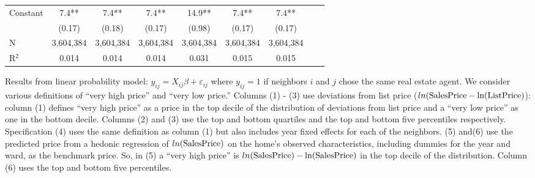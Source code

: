 \documentclass[12pt]{article}
\newcommand{\se}[1]{\footnotesize{(#1)}}
\begin{document}
\begin{sidewaystable}[ht]
\begin{tabular}{@{}lcccccccc@{}}
\multirow{2}{*}{Constant}                & 7.4**     & 7.4**     & 7.4**     & 14.9**    & 7.4**     & 7.4**\\
                                         & \se{0.17} & \se{0.18} & \se{0.17} & \se{0.98} & \se{0.17} & \se{0.17}\\\midrule
N                                        & 3,604,384 & 3,604,384 & 3,604,384 & 3,604,384 & 3,604,384 & 3,604,384\\
R$^2$                                    & 0.014     &  0.014    & 0.014     &  0.031    &  0.015    & 0.015 \\\bottomrule
\end{tabular}
\begin{minipage}{.88\hsize}{\footnotesize
    Results from linear probability model:  $y_{ij} = X_{ij} \beta + \varepsilon_{ij}$  where $y_{ij} = 1$ if neighbors $i$ and $j$ chose the same real estate agent.   We consider various definitions of ``very high price'' and ``very low price.'' Columns (1) - (3) use deviations from list price  ($ln(\rm{Sales Price} - ln(\rm{List Price})$): column (1) defines ``very high price'' as a price in the top decile of the distribution of   deviations from list price and a ``very low price'' as one in the bottom decile. Columns (2) and (3) use the top and bottom quartiles and the top   and bottom five percentiles respectively. Specification (4) uses the same definition as column (1) but also includes year fixed effects for each   of the neighbors.    (5) and(6) use the predicted price from a hedonic regression of $ln(\rm{Sales Price})$ on the home's observed characteristics, including dummies  for the year and ward, as the benchmark price. So, in (5) a ``very high price'' is $ln(\rm{Sales Price}) - ln(\rm{Sales Price})$ in the top decile of the distribution. Column (6) uses the top and bottom five percentiles.
}
\end{minipage}
\end{sidewaystable}
\end{document}
